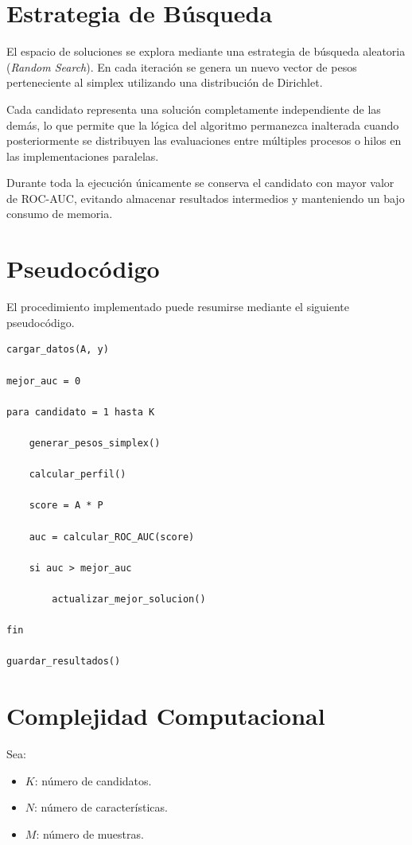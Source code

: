 \section{Estrategia de Búsqueda}

El espacio de soluciones se explora mediante una estrategia de búsqueda aleatoria (\textit{Random Search}). En cada iteración se genera un nuevo vector de pesos perteneciente al simplex utilizando una distribución de Dirichlet.

Cada candidato representa una solución completamente independiente de las demás, lo que permite que la lógica del algoritmo permanezca inalterada cuando posteriormente se distribuyen las evaluaciones entre múltiples procesos o hilos en las implementaciones paralelas.

Durante toda la ejecución únicamente se conserva el candidato con mayor valor de ROC-AUC, evitando almacenar resultados intermedios y manteniendo un bajo consumo de memoria.

\section{Pseudocódigo}

El procedimiento implementado puede resumirse mediante el siguiente pseudocódigo.

\begin{lstlisting}
cargar_datos(A, y)

mejor_auc = 0

para candidato = 1 hasta K

    generar_pesos_simplex()

    calcular_perfil()

    score = A * P

    auc = calcular_ROC_AUC(score)

    si auc > mejor_auc

        actualizar_mejor_solucion()

fin

guardar_resultados()
\end{lstlisting}

\section{Complejidad Computacional}

Sea:

\begin{itemize}

\item $K$: número de candidatos.

\item $N$: número de características.

\item $M$: número de muestras.

\end{itemize}

